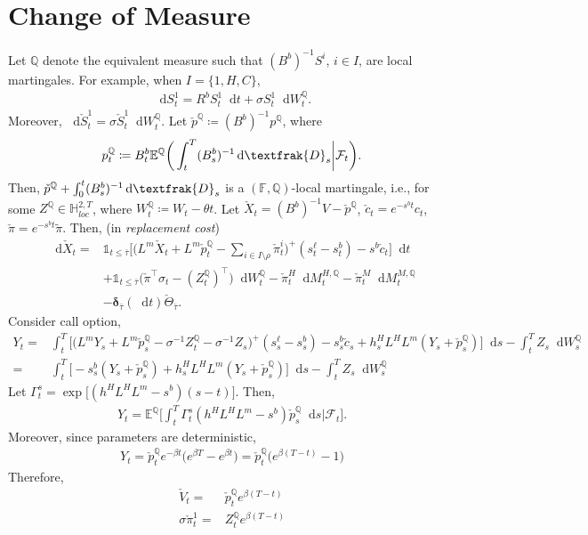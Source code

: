 \documentclass[a4paper, 11pt]{article}              %
\numberwithin{equation}{section}
\theoremstyle{plain}
\newcommand{\btau}{\bar{\tau}}
\newcommand{\1}{\mathds{1}}
\newcommand{\calF}{\mathcal{F}}
\newcommand{\frD}{\textfrak{D}}
\newcommand{\Sc}{\check{S}}
\newcommand{\Xc}{\check{X}}
\newcommand{\cc}{\check{c}}
\newcommand{\Vc}{\check{V}}
\newcommand{\pic}{\check{\pi}}
\newcommand{\pc}{\check{p}}
\newcommand{\pit}{\tilde{\pi}}
\newcommand{\dsE}{\mathbb{E}}
\newcommand{\dsF}{\mathbb{F}}
\newcommand{\dsH}{\mathbb{H}}
\newcommand{\dsQ}{\mathbb{Q}}
\newcommand{\SUM}{\displaystyle\sum}
\theoremstyle{plain}
\theoremstyle{definition}
\theoremstyle{plain}
\newcommand*\df{\mathop{}\!\mathrm{d}}
\begin{document}
\section{Change of Measure}
\label{sec:change-measure}
Let $\dsQ$ denote the equivalent measure such that $(B^b)^{-1}S^i$, $i \in I$, are
local martingales. For example, when $I = \{1, H, C\}$,
\begin{align}
 \df S^1_t = R^bS^1_t \df t +\sigma S^1_t\df W_t^\dsQ. \nonumber 
\end{align}
Moreover,  $\df \Sc^1_t = \sigma \Sc^1_t \df W^\dsQ_t$. 
Let $\pc^\dsQ \coloneqq (B^b)^{-1}p^\dsQ$, where
\begin{align}
  p^\dsQ_t \coloneqq B^b_t\dsE^\dsQ\bigg(\int_{t}^{T}(B^b_s)^{-1}\df
  \frD_s\bigg\vert\calF_t\bigg).\nonumber 
\end{align}
Then, $\pc^\dsQ +\int_{0}^{t} (B^b_s)^{-1}\df \frD_s$ is a $(\dsF, \dsQ)$-local
martingale, i.e., for some $Z^\dsQ \in \dsH^{2, T}_{loc}$, where 
$ W^\dsQ_t \coloneqq W_t - \theta t$. 
Let $\Xc_t = (B^{b})^{-1}V - \pc^\dsQ$, $\cc_t = e^{-s^bt}c_t$, $\pic =
e^{-s^bt}\pit$. Then, (in \textit{replacement cost})
\begin{align}
  \df \Xc_t
  =& \1_{t \leq \btau}\bigg[ \big(L^m\Xc_t + L^m\pc^\dsQ_t 
     - \SUM_{i \in I \setminus\rho}\pic^i_t\big)^+(s^\ell_t-s^{b}_t)-s^b\cc_t\bigg]\df t 
     \nonumber\\
   &+\1_{t \leq \btau}\big(\pic^{\top}\sigma_t-(Z^\dsQ_t)^{\top}\big)\df W^\dsQ_t
     - \pic^H_{t}\df M^{H, \dsQ}_t- \pic^M_{t}\df M^{M, \dsQ}_t\nonumber\\
     &- \bm{\delta}_{\btau}(\df t)\check{\Theta}_{\btau}.\nonumber 
\end{align}
Consider call option,  
\begin{align}
  Y_t =& \int_{t}^{T} \bigg[\big(L^mY_s +L^m\pc^\dsQ_s-\sigma^{-1}Z^\dsQ_t -
         \sigma^{-1}Z_s\big)^+(s^{\ell}_s-s^b_s)-s^b_s\cc_s+h^H_sL^HL^m(Y_s+\pc^\dsQ_s)\bigg]\df s
         -\int_{t}^{T}Z_s\df W^\dsQ_s    \nonumber\\
  =& \int_{t}^{T} \bigg[-s^b_s(Y_s+\pc^\dsQ_s)+h^H_sL^HL^m(Y_s+\pc^\dsQ_s)\bigg]\df s
         -\int_{t}^{T}Z_s\df W^\dsQ_s\nonumber 
\end{align}
Let $\Gamma^s_t = \exp{\big[(h^HL^HL^m-s^b)(s-t)\big]}$. Then,
\begin{align}
  Y_t = \dsE^\dsQ\bigg[
  \int_{t}^{T} \Gamma_t^s(h^HL^HL^m-s^b)\pc^\dsQ_s\df s
  \Big|\calF_t\bigg]  .\nonumber 
\end{align}
Moreover, since parameters are deterministic,
\begin{align}
  Y_t = \pc^\dsQ_te^{-\beta t}\big(e^{\beta T}-e^{\beta t}\big)
  =\pc^\dsQ_t\big(e^{\beta (T-t)}-1\big)\nonumber 
\end{align}
Therefore,
\begin{align}
  \Vc_t =&   \pc^\dsQ_te^{\beta (T-t)}\nonumber\\
  \sigma\pic^1_t = & Z^\dsQ_te^{\beta (T-t)}\nonumber 
\end{align}
\fi
\end{document}
